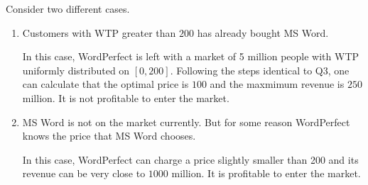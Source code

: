 \documentclass[a4paper]{article}
\begin{document}
    \begin{answer}[Q5]
    Consider two different cases.
    \begin{enumerate}
        \item Customers with WTP greater than $200$ has already bought MS Word. 
        
        In this case, WordPerfect is left with a market of 5 million people with WTP uniformly distributed on $[0,200]$. Following the steps identical to Q3, one can calculate that the optimal price is $100$ and the maxmimum revenue is $250$ million. It is not profitable to enter the market.
        
        \item MS Word is not on the market currently. But for some reason WordPerfect knows the price that MS Word chooses.
        
        In this case, WordPerfect can charge a price slightly smaller than 200 and its revenue can be very close to $1000$ million. It is profitable to enter the market.
    \end{enumerate}
    \end{answer}
    
\end{document}
